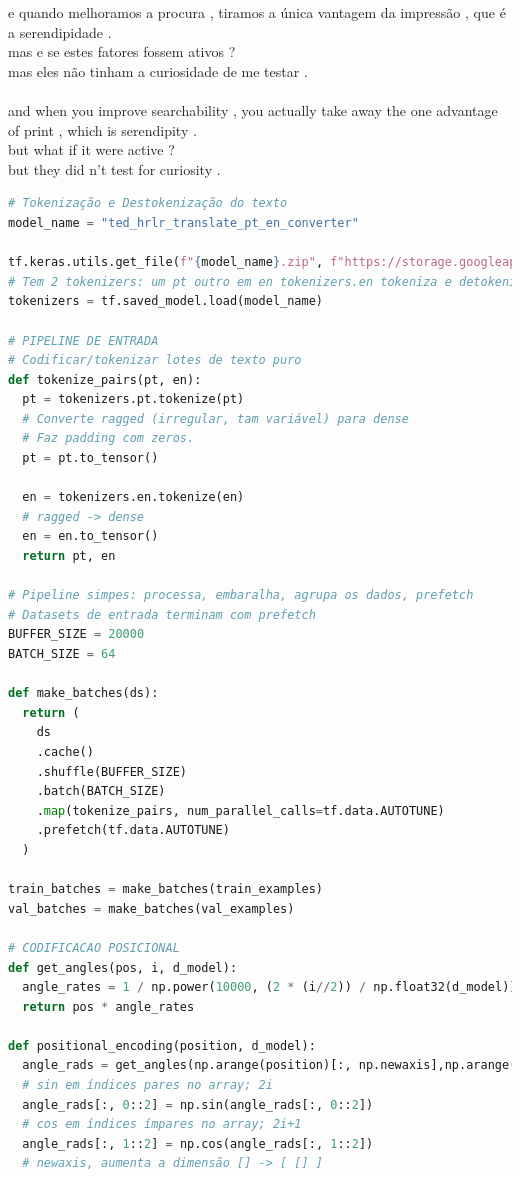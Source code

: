 \begin{tcolorbox}[myoutputstyle]
e quando melhoramos a procura , tiramos a única vantagem da impressão , que é a serendipidade .\\
mas e se estes fatores fossem ativos ?\\
mas eles não tinham a curiosidade de me testar .\\
\\
and when you improve searchability , you actually take away the one advantage of print , which is serendipity .\\
but what if it were active ?\\
but they did n't test for curiosity .
\end{tcolorbox}


\begin{lstlisting}[language=Python, style=input]
# Tokenização e Destokenização do texto
model_name = "ted_hrlr_translate_pt_en_converter"

tf.keras.utils.get_file(f"{model_name}.zip", f"https://storage.googleapis.com/download.tensorflow.org/models/{model_name}.zip", cache_dir='.', cache_subdir='', extract=True)
# Tem 2 tokenizers: um pt outro em en tokenizers.en tokeniza e detokeniza
tokenizers = tf.saved_model.load(model_name)

# PIPELINE DE ENTRADA
# Codificar/tokenizar lotes de texto puro
def tokenize_pairs(pt, en):
  pt = tokenizers.pt.tokenize(pt)
  # Converte ragged (irregular, tam variável) para dense
  # Faz padding com zeros.
  pt = pt.to_tensor()

  en = tokenizers.en.tokenize(en)
  # ragged -> dense
  en = en.to_tensor()
  return pt, en

# Pipeline simpes: processa, embaralha, agrupa os dados, prefetch
# Datasets de entrada terminam com prefetch
BUFFER_SIZE = 20000
BATCH_SIZE = 64

def make_batches(ds):
  return (
    ds
    .cache()
    .shuffle(BUFFER_SIZE)
    .batch(BATCH_SIZE)
    .map(tokenize_pairs, num_parallel_calls=tf.data.AUTOTUNE)
    .prefetch(tf.data.AUTOTUNE)
  )

train_batches = make_batches(train_examples)
val_batches = make_batches(val_examples)

# CODIFICACAO POSICIONAL
def get_angles(pos, i, d_model):
  angle_rates = 1 / np.power(10000, (2 * (i//2)) / np.float32(d_model))
  return pos * angle_rates

def positional_encoding(position, d_model):
  angle_rads = get_angles(np.arange(position)[:, np.newaxis],np.arange(d_model)[np.newaxis, :],d_model)
  # sin em índices pares no array; 2i
  angle_rads[:, 0::2] = np.sin(angle_rads[:, 0::2])
  # cos em índices ímpares no array; 2i+1
  angle_rads[:, 1::2] = np.cos(angle_rads[:, 1::2])
  # newaxis, aumenta a dimensão [] -> [ [] ]


\end{lstlisting}
